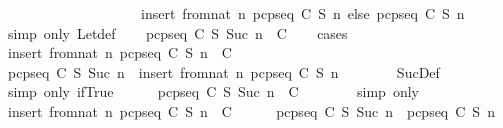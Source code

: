 \begin{isabellebody}
\ \ \ \ \ \ \ \ \ \ \ \ \ \ \ \ \ \ \ \ insert\ {\isacharparenleft}from{\isacharunderscore}nat\ n{\isacharparenright}\ {\isacharparenleft}pcp{\isacharunderscore}seq\ C\ S\ n{\isacharparenright}\ else\ pcp{\isacharunderscore}seq\ C\ S\ n{\isacharparenright}{\isachardoublequoteclose}\ \isanewline
\ \ \ \ \isamarkupfalse%
\ {\isacharparenleft}simp\ only{\isacharcolon}\ Let{\isacharunderscore}def{\isacharparenright}\isanewline
\ \ \isamarkupfalse%
\ {\isachardoublequoteopen}pcp{\isacharunderscore}seq\ C\ S\ {\isacharparenleft}Suc\ n{\isacharparenright}\ {\isasymin}\ C{\isachardoublequoteclose}\isanewline
\ \ \isamarkupfalse%
\ {\isacharparenleft}cases{\isacharparenright}\isanewline
\ \ \ \ \isamarkupfalse%
\ {}{\isacharcolon}{\isachardoublequoteopen}insert\ {\isacharparenleft}from{\isacharunderscore}nat\ n{\isacharparenright}\ {\isacharparenleft}pcp{\isacharunderscore}seq\ C\ S\ n{\isacharparenright}\ {\isasymin}\ C{\isachardoublequoteclose}\isanewline
\ \ \ \ \isamarkupfalse%
\ {\isachardoublequoteopen}pcp{\isacharunderscore}seq\ C\ S\ {\isacharparenleft}Suc\ n{\isacharparenright}\ {\isacharequal}\ insert\ {\isacharparenleft}from{\isacharunderscore}nat\ n{\isacharparenright}\ {\isacharparenleft}pcp{\isacharunderscore}seq\ C\ S\ n{\isacharparenright}{\isachardoublequoteclose}\isanewline
\ \ \ \ \ \ \isamarkupfalse%
\ SucDef\ {}\ \isamarkupfalse%
\ {\isacharparenleft}simp\ only{\isacharcolon}\ if{\isacharunderscore}True{\isacharparenright}\isanewline
\ \ \ \ \isamarkupfalse%
\ {\isachardoublequoteopen}pcp{\isacharunderscore}seq\ C\ S\ {\isacharparenleft}Suc\ n{\isacharparenright}\ {\isasymin}\ C{\isachardoublequoteclose}\isanewline
\ \ \ \ \ \ \isamarkupfalse%
\ {\isacharparenleft}simp\ only{\isacharcolon}\ {}{\isacharparenright}\isanewline
\ \ \isamarkupfalse%
\isanewline
\ \ \ \ \isamarkupfalse%
\ {}{\isacharcolon}{\isachardoublequoteopen}insert\ {\isacharparenleft}from{\isacharunderscore}nat\ n{\isacharparenright}\ {\isacharparenleft}pcp{\isacharunderscore}seq\ C\ S\ n{\isacharparenright}\ {\isasymnotin}\ C{\isachardoublequoteclose}\isanewline
\ \ \ \ \isamarkupfalse%
\ {\isachardoublequoteopen}pcp{\isacharunderscore}seq\ C\ S\ {\isacharparenleft}Suc\ n{\isacharparenright}\ {\isacharequal}\ pcp{\isacharunderscore}seq\ C\ S\ n{\isachardoublequoteclose}\isanewline
\ \ \ \ \ \ \isamarkupfalse%

\end{isabellebody}
